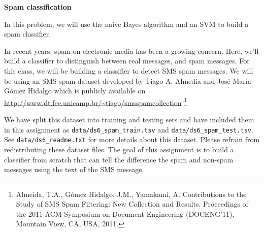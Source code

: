 \newpage
\item {} {\bf Spam classification}

In this problem, we will use the naive Bayes algorithm and an SVM to 
build a spam classifier.  

In recent years, spam on electronic media has been a growing concern.  Here, we'll build a classifier to distinguish
between real messages, and spam messages. For this class, we will be building a classifier to detect SMS spam messages. We will be using an SMS spam dataset developed by Tiago A. Almedia and José María Gómez Hidalgo which is publicly available on \url{http://www.dt.fee.unicamp.br/~tiago/smsspamcollection} \footnote{Almeida, T.A., Gómez Hidalgo, J.M., Yamakami, A. Contributions to the Study of SMS Spam Filtering: New Collection and Results.  Proceedings of the 2011 ACM Symposium on Document Engineering (DOCENG'11), Mountain View, CA, USA, 2011.}

We have split this dataset into training and testing sets and have included them in this assignment as \texttt{data/ds6\_spam\_train.tsv} and \texttt{data/ds6\_spam\_test.tsv}. See \texttt{data/ds6\_readme.txt} for more details about this dataset. Please refrain from redistributing these dataset files. The goal of this assignment is to build a classifier from scratch that can tell the difference the spam and non-spam messages using the text of the SMS message.

\begin{enumerate}
  
  
  

  

  
  
\end{enumerate}
